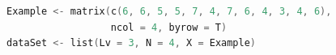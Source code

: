\begin{lstlisting}[language=c++,label={code:21_01},caption={三群の平均値の比較}]
Example <- matrix(c(6, 6, 5, 5, 7, 4, 7, 6, 4, 3, 4, 6), 
                  ncol = 4, byrow = T)
dataSet <- list(Lv = 3, N = 4, X = Example)
\end{lstlisting}
